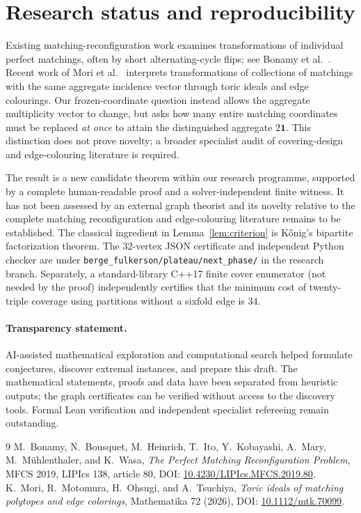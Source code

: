 \documentclass[11pt]{article}
\begin{document}
\section{Research status and reproducibility}
Existing matching-reconfiguration work examines transformations of individual perfect matchings, often by short alternating-cycle flips; see Bonamy et al.~\cite{Bonamy2019}. Recent work of Mori et al.~\cite{Mori2026} interprets transformations of collections of matchings with the same aggregate incidence vector through toric ideals and edge colourings. Our frozen-coordinate question instead allows the aggregate multiplicity vector to change, but asks how many entire matching coordinates must be replaced \emph{at once} to attain the distinguished aggregate $2\mathbf1$. This distinction does not prove novelty; a broader specialist audit of covering-design and edge-colouring literature is required.\par
The result is a new candidate theorem within our research programme, supported by a complete human-readable proof and a solver-independent finite witness. It has not been assessed by an external graph theorist and its novelty relative to the complete matching reconfiguration and edge-colouring literature remains to be established. The classical ingredient in Lemma~\ref{lem:criterion} is K\H{o}nig's bipartite factorization theorem. The $32$-vertex JSON certificate and independent Python checker are under \texttt{berge\_fulkerson/plateau/next\_phase/} in the research branch. Separately, a standard-library C++17 finite cover enumerator (not needed by the proof) independently certifies that the minimum cost of twenty-triple coverage using partitions without a sixfold edge is $34$.

\paragraph{Transparency statement.} AI-assisted mathematical exploration and computational search helped formulate conjectures, discover extremal instances, and prepare this draft. The mathematical statements, proofs and data have been separated from heuristic outputs; the graph certificates can be verified without access to the discovery tools. Formal Lean verification and independent specialist refereeing remain outstanding.

\begin{thebibliography}{9}
 M.~Bonamy, N.~Bousquet, M.~Heinrich, T.~Ito, Y.~Kobayashi, A.~Mary, M.~M\"uhlenthaler, and K.~Wasa, \emph{The Perfect Matching Reconfiguration Problem}, MFCS 2019, LIPIcs 138, article 80, DOI: \href{https://doi.org/10.4230/LIPIcs.MFCS.2019.80}{10.4230/LIPIcs.MFCS.2019.80}.
 K.~Mori, R.~Motomura, H.~Ohsugi, and A.~Tsuchiya, \emph{Toric ideals of matching polytopes and edge colorings}, Mathematika 72 (2026), DOI: \href{https://doi.org/10.1112/mtk.70099}{10.1112/mtk.70099}.
\end{thebibliography}
\end{document}
